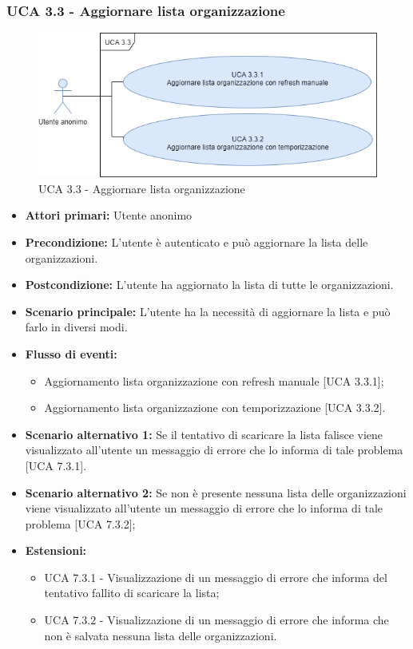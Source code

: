 \subsubsection{UCA 3.3 - Aggiornare lista organizzazione}%

\begin{figure}[h]
	\centering
	\includegraphics[scale=0.5]{sezioni/UseCase/Immagini/UCA3.3.png}
	\caption{UCA 3.3 - Aggiornare lista organizzazione}
\end{figure}

\begin{itemize} 
	\item \textbf{Attori primari:} Utente anonimo
	\item \textbf{Precondizione:} L'utente è autenticato e può aggiornare la lista delle organizzazioni.
	\item \textbf{Postcondizione:} L'utente ha aggiornato la lista di tutte le organizzazioni.
	\item \textbf{Scenario principale:}  L'utente ha la necessità di aggiornare la lista e può farlo in diversi modi.
	\item \textbf{Flusso di eventi:}
	\begin{itemize}
		\item Aggiornamento lista organizzazione con refresh manuale [UCA 3.3.1];
		\item Aggiornamento lista organizzazione con temporizzazione [UCA 3.3.2].
	\end{itemize}
	\item \textbf{Scenario alternativo 1:} Se il tentativo di scaricare la lista falisce viene visualizzato all'utente un messaggio di errore che lo informa di tale problema [UCA 7.3.1].
	\item \textbf{Scenario alternativo 2:} Se non è presente nessuna lista delle organizzazioni viene visualizzato all'utente un messaggio di errore che lo informa di tale problema [UCA 7.3.2];
	\item \textbf{Estensioni:}
	\begin{itemize}
		\item UCA 7.3.1 - Visualizzazione di un messaggio di errore che informa del tentativo fallito di scaricare la lista;
		\item UCA 7.3.2 - Visualizzazione di un messaggio di errore che informa che non è salvata nessuna lista delle organizzazioni.
	\end{itemize}
\end{itemize}

